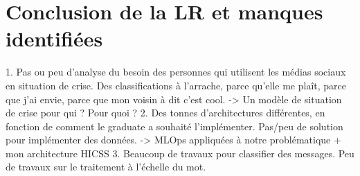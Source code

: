 \section{Conclusion de la LR et manques identifiées}
1. Pas ou peu d'analyse du besoin des personnes qui utilisent les médias sociaux en situation de crise. Des classifications à l'arrache, parce qu'elle me plaît, parce que j'ai envie, parce que mon voisin à dit c'est cool.
-> Un modèle de situation de crise pour qui ? Pour quoi ?
2. Des tonnes d'architectures différentes, en fonction de comment le graduate a souhaité l'implémenter. Pas/peu de solution pour implémenter des données.
-> MLOps appliquées à notre problématique + mon architecture HICSS
3. Beaucoup de travaux pour classifier des messages. Peu de travaux sur le traitement à l'échelle du mot.



